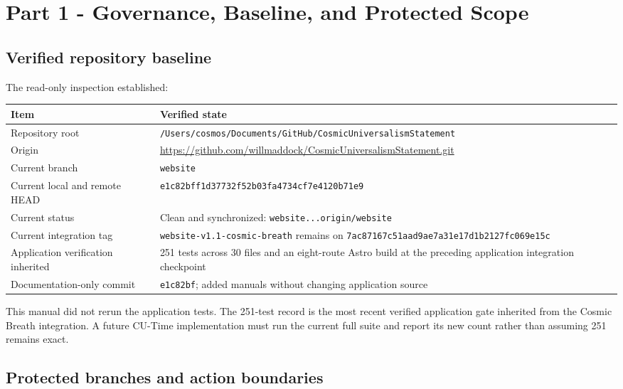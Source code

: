 \documentclass[11pt,letterpaper]{article}
\newcommand{\filepath}[1]{\nolinkurl{#1}}
\newcommand{\branchname}[1]{\texttt{#1}}
\newcommand{\release}[1]{\texttt{#1}}
\begin{document}
\section{Part 1 - Governance, Baseline, and Protected Scope}

\subsection{Verified repository baseline}

The read-only inspection established:

\begin{tabularx}{\textwidth}{L{2.15in}Y}
\toprule
\textbf{Item} & \textbf{Verified state} \\
\midrule
Repository root & \filepath{/Users/cosmos/Documents/GitHub/CosmicUniversalismStatement} \\
Origin & \url{https://github.com/willmaddock/CosmicUniversalismStatement.git} \\
Current branch & \branchname{website} \\
Current local and remote HEAD & \release{e1c82bff1d37732f52b03fa4734cf7e4120b71e9} \\
Current status & Clean and synchronized: \texttt{website...origin/website} \\
Current integration tag & \release{website-v1.1-cosmic-breath} remains on \release{7ac87167c51aad9ae7a31e17d1b2127fc069e15c} \\
Application verification inherited & 251 tests across 30 files and an eight-route Astro build at the preceding application integration checkpoint \\
Documentation-only commit & \release{e1c82bf}; added manuals without changing application source \\
\bottomrule
\end{tabularx}

\begin{notebox}
This manual did not rerun the application tests. The 251-test record is the
most recent verified application gate inherited from the Cosmic Breath
integration. A future CU-Time implementation must run the current full suite
and report its new count rather than assuming 251 remains exact.
\end{notebox}

\subsection{Protected branches and action boundaries}
\end{document}
